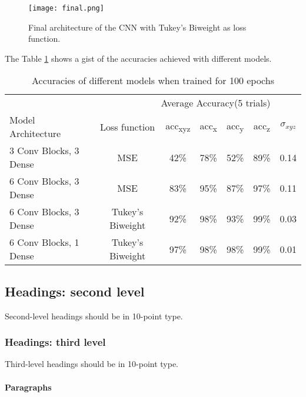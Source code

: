 \documentclass{article}
\begin{document}
\begin{figure}[ht]
  \centering
  \texttt{[image: final.png]}
  \caption{Final architecture of the CNN with Tukey's Biweight as loss function.}
  \label{fig:model3}
\end{figure}

The Table \ref{acc-table} shows a gist of the accuracies achieved with different models.

\begin{table}[t]
  \caption{Accuracies of different models when trained for 100 epochs}
  \label{acc-table}
  \centering
  \begin{tabular}{lcccccc}
    \toprule
    \multicolumn{6}{r}{Average Accuracy(5 trials)}                   \\
    \cmidrule{3-7}
    Model Architecture & Loss function & acc\textsubscript{xyz }& acc\textsubscript{x} & acc\textsubscript{y} & acc\textsubscript{z} & $\sigma_{xyz}$\\
    \midrule
    3 Conv Blocks, 3 Dense & MSE  & 42\% & 78\% & 52\% & 89\% & 0.14\\
    6 Conv Blocks, 3 Dense & MSE & 83\% & 95\% & 87\% & 97\% & 0.11\\
    6 Conv Blocks, 3 Dense & Tukey's Biweight & 92\% & 98\% & 93\% & 99\% & 0.03 \\
    6 Conv Blocks, 1 Dense & Tukey's Biweight & 97\% & 98\% & 98\% & 99\% & 0.01 \\
    \bottomrule
  \end{tabular}
\end{table}




\subsection{Headings: second level}

Second-level headings should be in 10-point type.

\subsubsection{Headings: third level}

Third-level headings should be in 10-point type.

\paragraph{Paragraphs}
\end{document}
